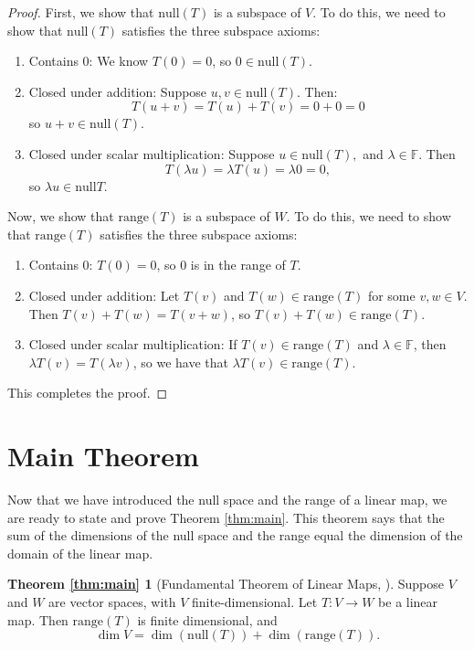 \documentclass[11pt,reqno]{amsart}
\theoremstyle{definition}
\newtheorem*{maintheorema}{Theorem \ref{thm:main}}
\newcommand{\F}{\mathbb{F}}
\newcommand{\nul}{\mathrm{null}}
\newcommand{\range}{\mathrm{range}}
\begin{document}
\begin{proof} 
First, we show that $\nul(T)$ is a subspace of $V$. To do this, we need to show that $\nul(T)$ satisfies the three subspace axioms:
\begin{enumerate}
    \item Contains 0: We know $T(0) = 0$, so $0 \in \nul(T)$.
    \item Closed under addition: Suppose $u,v \in \nul(T)$. Then:
    $$
   T(u + v) = T(u) + T(v) = 0 + 0 = 0
    $$
    so $u+ v \in \nul(T)$.
    \item Closed under scalar multiplication: Suppose $u \in \nul(T),$ and $\lambda \in \F$. Then
    $$
    T(\lambda u) = \lambda T(u) = \lambda 0 = 0,
    $$
    so $\lambda u \in \nul T$.
\end{enumerate}
Now, we show that $\range(T)$ is a subspace of $W$. To do this, we need to show that $\range(T)$ satisfies the three subspace axioms:
\begin{enumerate}
   \item Contains 0: $T(0) = 0$, so $0$ is in the range of $T$.
    \item Closed under addition: Let $T(v)$ and $T(w) \in \range(T)$ for some $v,w \in V$. Then $T(v) + T(w) = T(v+w)$, so $T(v) + T(w) \in \range(T)$.
    \item Closed under scalar multiplication: If $T(v)\in \range(T)$ and $\lambda \in \F$, then $\lambda T(v) = T(\lambda v)$, so we have that $\lambda T(v) \in \range(T)$.
\end{enumerate}
This completes the proof.
\end{proof}




\section{Main Theorem}
\label{sec:proof}

Now that we have introduced the null space and the range of a linear map, we are ready to state and prove Theorem \ref{thm:main}. This theorem says that the sum of the dimensions of the null space and the range equal the dimension of the domain of the linear map.

\begin{maintheorema}[{Fundamental Theorem of Linear Maps, \cite[3.22]{axler}}]
Suppose $V$ and $W$ are vector spaces, with $V$ finite-dimensional. Let $T: V \rightarrow W$ be a linear map. Then $\range(T)$ is finite dimensional, and 
$$
\dim V = \dim (\nul (T)) + \dim (\range (T)).
$$
\end{maintheorema}
\end{document}
